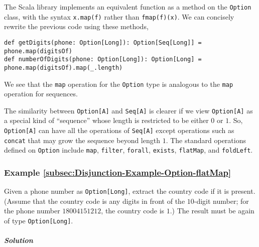 The Scala library implements an equivalent function as a method on
the \lstinline!Option! class, with the syntax \lstinline!x.map(f)!
rather than \lstinline!fmap(f)(x)!. We can concisely rewrite the
previous code using these methods,
\begin{lstlisting}
def getDigits(phone: Option[Long]): Option[Seq[Long]] = phone.map(digitsOf)
def numberOfDigits(phone: Option[Long]): Option[Long] = phone.map(digitsOf).map(_.length)
\end{lstlisting}
We see that the \lstinline!map! operation for the \lstinline!Option!
type is analogous to the \lstinline!map! operation for sequences. 

The similarity between \lstinline!Option[A]! and \lstinline!Seq[A]!
is clearer if we view \lstinline!Option[A]! as a special kind of
\textsf{``}sequence\textsf{''} whose length is restricted to be either $0$ or $1$.
So, \lstinline!Option[A]! can have all the operations of \lstinline!Seq[A]!
except operations such as \lstinline!concat! that may grow the sequence
beyond length $1$. The standard operations defined on \lstinline!Option!
include \lstinline!map!, \lstinline!filter!, \lstinline!forall!,
\lstinline!exists!, \lstinline!flatMap!, and \lstinline!foldLeft!.

\subsubsection{Example \label{subsec:Disjunction-Example-Option-flatMap}\ref{subsec:Disjunction-Example-Option-flatMap}}

Given a phone number as \lstinline!Option[Long]!, extract the country
code if it is present. (Assume that the country code is any digits
in front of the $10$-digit number; for the phone number $18004151212$,
the country code is $1$.) The result must be again of type \lstinline!Option[Long]!.

\subparagraph{Solution}


